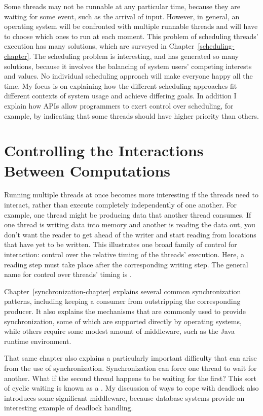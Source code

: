 Some threads may not be runnable at any particular time, because they
are waiting for some event, such as the arrival of input.  However, in
general, an operating system will be confronted with multiple runnable
threads and will have to choose which ones to run at each
moment.  This problem of scheduling threads' execution has many
solutions, which are surveyed in Chapter~\ref{scheduling-chapter}.
The scheduling problem is interesting, and has generated
so many solutions, because it involves the balancing of system
users' competing interests and values.  No individual scheduling approach
will make everyone happy all the time.  My focus is on explaining how
the different scheduling approaches fit different contexts of system
usage and achieve differing goals.  In addition I explain how APIs allow
programmers to exert control over scheduling, for example, by
indicating that some threads should have higher priority than others.

\section[Interactions Between
  Computations]{Controlling the Interactions Between
  Computations}\label{controlled-interaction-section}

Running multiple threads at once becomes more interesting if the
threads need to interact, rather than execute completely
independently of one another.  For example, one thread might be
producing data that another thread consumes.  If one thread is writing
data into memory and another is reading the data out, you don't want
the reader to get ahead of the writer and start reading from locations
that have yet to be written.  This illustrates one broad family of
control for interaction: control over the relative timing of the
threads' execution.  Here, a reading step must take place after the
corresponding writing step.  The general name for control over
threads' timing is .

Chapter~\ref{synchronization-chapter} explains several common
synchronization patterns, including keeping a consumer from
outstripping the corresponding producer.  It also explains the
mechanisms that are commonly used to provide synchronization, some of
which are supported directly by operating systems, while others
require some modest amount of middleware, such as the Java runtime
environment.

That same chapter also explains a particularly important difficulty
that can arise from the use of synchronization.  Synchronization can
force one thread to wait for another.  What if the second thread
happens to be waiting for the first?  This sort of cyclic waiting is
known as a .  My discussion of ways to cope with deadlock
also introduces some significant
middleware, because database systems provide an interesting example of
deadlock handling.

